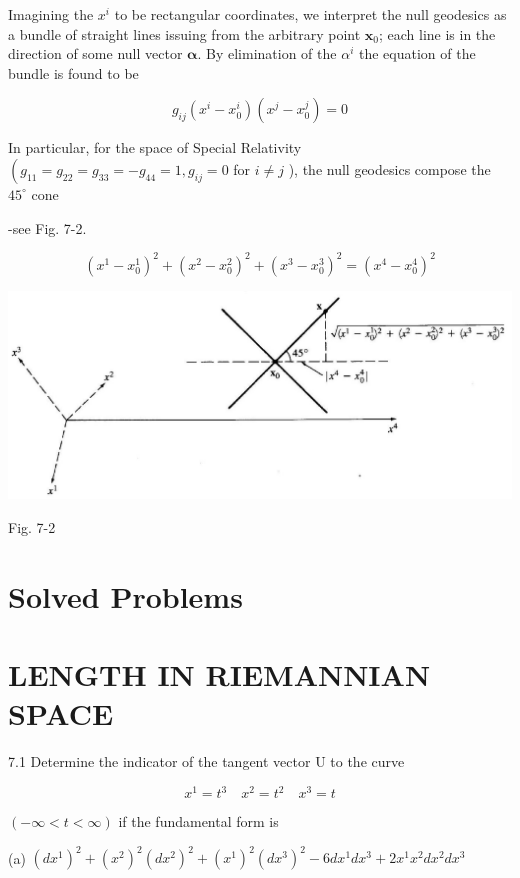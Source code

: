 \documentclass[10pt]{article}
\begin{document}
Imagining the $x^{i}$ to be rectangular coordinates, we interpret the null geodesics as a bundle of straight lines issuing from the arbitrary point $\mathbf{x}_{0}$; each line is in the direction of some null vector $\boldsymbol{\alpha}$. By elimination of the $\alpha^{i}$ the equation of the bundle is found to be

$$
g_{i j}\left(x^{i}-x_{0}^{i}\right)\left(x^{j}-x_{0}^{j}\right)=0
$$

In particular, for the space of Special Relativity $\left(g_{11}=g_{22}=g_{33}=-g_{44}=1, g_{i j}=0\right.$ for $i \neq j$ ), the null geodesics compose the $45^{\circ}$ cone

-see Fig. 7-2.

$$
\left(x^{1}-x_{0}^{1}\right)^{2}+\left(x^{2}-x_{0}^{2}\right)^{2}+\left(x^{3}-x_{0}^{3}\right)^{2}=\left(x^{4}-x_{0}^{4}\right)^{2}
$$

\begin{center}
\includegraphics[max width=\textwidth]{2024_04_03_41f90be4f896e21f0dc9g-098}
\end{center}

Fig. 7-2

\section*{Solved Problems}
\section*{LENGTH IN RIEMANNIAN SPACE}
7.1 Determine the indicator of the tangent vector $\mathrm{U}$ to the curve

$$
x^{1}=t^{3} \quad x^{2}=t^{2} \quad x^{3}=t
$$

$(-\infty<t<\infty)$ if the fundamental form is

(a) $\left(d x^{1}\right)^{2}+\left(x^{2}\right)^{2}\left(d x^{2}\right)^{2}+\left(x^{1}\right)^{2}\left(d x^{3}\right)^{2}-6 d x^{1} d x^{3}+2 x^{1} x^{2} d x^{2} d x^{3}$
\end{document}
